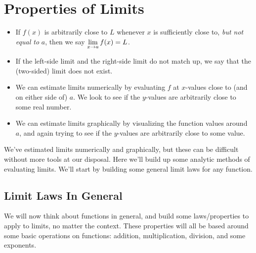 \section{Properties of Limits}

\begin{recap}
  \begin{itemize}
    \item If $f(x)$ is arbitrarily close to $L$ whenever $x$ is sufficiently close to, \textit{but not equal to} $a$, then we say $\displaystyle \lim_{x\to a}f(x) = L$.
    \item If the left-side limit and the right-side limit do not match up, we say that the (two-sided) limit does not exist.
    \item We can estimate limits numerically by evaluating $f$ at $x$-values close to (and on either side of) $a$.
    We look to see if the $y$-values are arbitrarily close to some real number.
    \item We can estimate limits graphically by visualizing the function values around $a$, and again trying to see if the $y$-values are arbitrarily close to some value.
  \end{itemize}
\end{recap}

We've estimated limits numerically and graphically, but these can be difficult without more tools at our disposal.
Here we'll build up some analytic methods of evaluating limits.
We'll start by building some general limit laws for any function.

\subsection*{Limit Laws In General}

We will now think about functions in general, and build some laws/properties to apply to limits, no matter the context.
These properties will all be based around some basic operations on functions: addition, multiplication, division, and some exponents.

